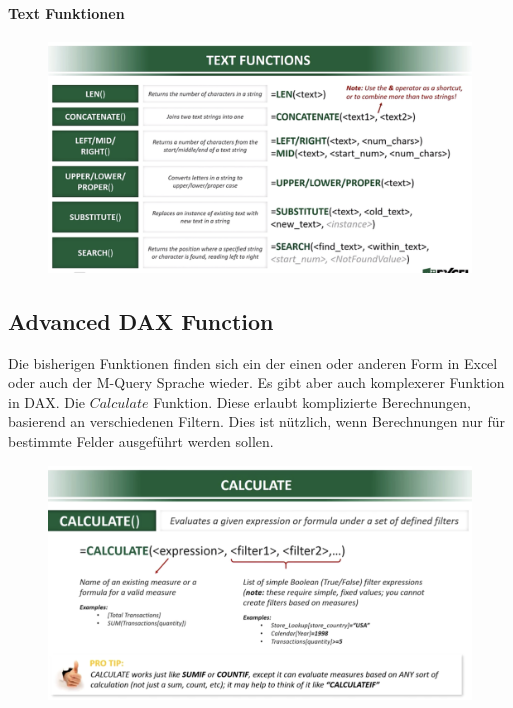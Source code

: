 \paragraph{Text Funktionen} 

\begin{figure}[H]
	\centering
	\includegraphics[scale = 0.3]{attachment/chapter_1/screenshot095}
	\caption{}
	\label{fig:screenshot095}
\end{figure}
\subsection{Advanced DAX Function}
Die bisherigen Funktionen finden sich ein der einen oder anderen Form in Excel oder auch der M-Query Sprache wieder. Es gibt aber auch komplexerer Funktion in \gls{DAX}. Die $Calculate$ Funktion. Diese erlaubt komplizierte Berechnungen, basierend an verschiedenen Filtern. Dies ist nützlich, wenn Berechnungen nur für bestimmte Felder ausgeführt werden sollen. 
\begin{figure}[H]
	\centering
	\includegraphics[scale = 0.3]{attachment/chapter_1/screenshot096}
	\caption{}
	\label{fig:screenshot096}
\end{figure} 
